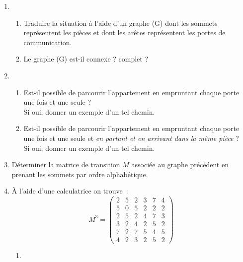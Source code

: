 \begin{enumerate}
     \item %
     \par
     \begin{enumerate}[label=\alph*.]
          \item %
          Traduire la situation à l'aide d'un graphe (G) dont les sommets représentent les pièces et dont les arêtes représentent les portes de communication.
          \item %
          Le graphe (G) est-il connexe ? complet ?
     \end{enumerate}
     \par
     \item %
     \par
     \begin{enumerate}[label=\alph*.]
          \item %
          Est-il possible de parcourir l'appartement en empruntant chaque porte une fois et une seule ?\\
          Si oui, donner un exemple d'un tel chemin.
          \item %
          Est-il possible de parcourir l'appartement en empruntant chaque porte une fois et une seule et \textit{en partant et en arrivant dans la même pièce} ?\\
          Si oui, donner un exemple d'un tel chemin.
     \end{enumerate}
     \par
     \item %
     Déterminer la matrice de transition $M$ associée au graphe précédent en prenant les sommets par ordre alphabétique.
     \par
     \item %
     \par
     \`A l'aide d'une calculatrice on trouve~:
     \[ M^3 = \begin{pmatrix}
          2 &5 &2 &3 &7 &4 \\
          5 &0 &5 &2 &2 &2 \\
          2 &5 &2 &4 &7 &3 \\
          3 &2 &4 &2 &5 &2 \\
          7 &2 &7 &5 &4 &5\\
     4 &2 &3 &2 &5 &2  \end{pmatrix} \]
     \begin{enumerate}[label=\alph*.]
          \item %
          \par

\end{enumerate}
\end{enumerate}
